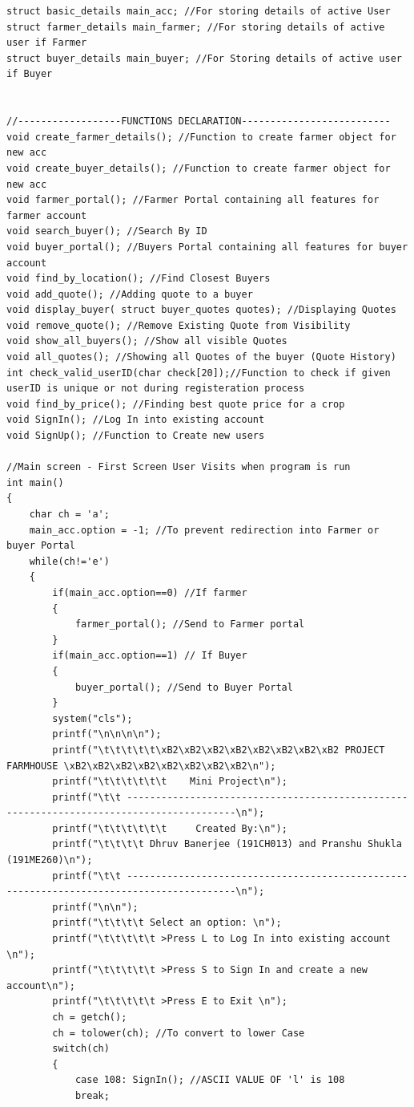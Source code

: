 \documentclass[12pt]{article}
\begin{document}
\begin{lstlisting}
struct basic_details main_acc; //For storing details of active User
struct farmer_details main_farmer; //For storing details of active user if Farmer
struct buyer_details main_buyer; //For Storing details of active user if Buyer


//------------------FUNCTIONS DECLARATION--------------------------
void create_farmer_details(); //Function to create farmer object for new acc
void create_buyer_details(); //Function to create farmer object for new acc
void farmer_portal(); //Farmer Portal containing all features for farmer account
void search_buyer(); //Search By ID
void buyer_portal(); //Buyers Portal containing all features for buyer account
void find_by_location(); //Find Closest Buyers
void add_quote(); //Adding quote to a buyer
void display_buyer( struct buyer_quotes quotes); //Displaying Quotes
void remove_quote(); //Remove Existing Quote from Visibility
void show_all_buyers(); //Show all visible Quotes
void all_quotes(); //Showing all Quotes of the buyer (Quote History)
int check_valid_userID(char check[20]);//Function to check if given userID is unique or not during registeration process
void find_by_price(); //Finding best quote price for a crop
void SignIn(); //Log In into existing account
void SignUp(); //Function to Create new users

//Main screen - First Screen User Visits when program is run
int main()
{
    char ch = 'a';
    main_acc.option = -1; //To prevent redirection into Farmer or buyer Portal
    while(ch!='e')
    {
        if(main_acc.option==0) //If farmer
        {
            farmer_portal(); //Send to Farmer portal
        }
        if(main_acc.option==1) // If Buyer
        {
            buyer_portal(); //Send to Buyer Portal
        }
        system("cls");
        printf("\n\n\n\n");
        printf("\t\t\t\t\t\xB2\xB2\xB2\xB2\xB2\xB2\xB2\xB2 PROJECT FARMHOUSE \xB2\xB2\xB2\xB2\xB2\xB2\xB2\xB2\n");
        printf("\t\t\t\t\t\t    Mini Project\n");
        printf("\t\t -----------------------------------------------------------------------------------------\n");
        printf("\t\t\t\t\t\t     Created By:\n");
        printf("\t\t\t\t Dhruv Banerjee (191CH013) and Pranshu Shukla (191ME260)\n");
        printf("\t\t -----------------------------------------------------------------------------------------\n");
        printf("\n\n");
        printf("\t\t\t\t Select an option: \n");
        printf("\t\t\t\t\t >Press L to Log In into existing account \n");
        printf("\t\t\t\t\t >Press S to Sign In and create a new account\n");
        printf("\t\t\t\t\t >Press E to Exit \n");
        ch = getch();
        ch = tolower(ch); //To convert to lower Case
        switch(ch)
        {
            case 108: SignIn(); //ASCII VALUE OF 'l' is 108
            break;


\end{lstlisting}
\end{document}

